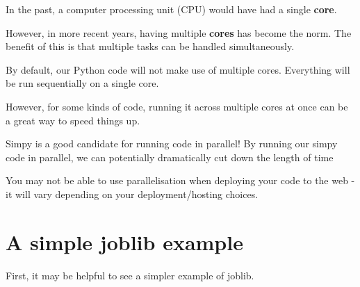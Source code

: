 \documentclass[
  letterpaper,
  DIV=11,
  numbers=noendperiod]{scrreprt}
\begin{document}
\begin{tcolorbox}[enhanced jigsaw, rightrule=.15mm, colback=white, colframe=quarto-callout-note-color-frame, colbacktitle=quarto-callout-note-color!10!white, toprule=.15mm, coltitle=black, opacityback=0, titlerule=0mm, bottomtitle=1mm, breakable, title=\textcolor{quarto-callout-note-color}{\faInfo}\hspace{0.5em}{Note}, opacitybacktitle=0.6, toptitle=1mm, arc=.35mm, bottomrule=.15mm, leftrule=.75mm, left=2mm]

In the past, a computer processing unit (CPU) would have had a single
\textbf{core}.

However, in more recent years, having multiple \textbf{cores} has become
the norm. The benefit of this is that multiple tasks can be handled
simultaneously.

By default, our Python code will not make use of multiple cores.
Everything will be run sequentially on a single core.

However, for some kinds of code, running it across multiple cores at
once can be a great way to speed things up.

\end{tcolorbox}

Simpy is a good candidate for running code in parallel! By running our
simpy code in parallel, we can potentially dramatically cut down the
length of time

\begin{tcolorbox}[enhanced jigsaw, rightrule=.15mm, colback=white, colframe=quarto-callout-warning-color-frame, colbacktitle=quarto-callout-warning-color!10!white, toprule=.15mm, coltitle=black, opacityback=0, titlerule=0mm, bottomtitle=1mm, breakable, title=\textcolor{quarto-callout-warning-color}{\faExclamationTriangle}\hspace{0.5em}{Warning}, opacitybacktitle=0.6, toptitle=1mm, arc=.35mm, bottomrule=.15mm, leftrule=.75mm, left=2mm]

You may not be able to use parallelisation when deploying your code to
the web - it will vary depending on your deployment/hosting choices.

\end{tcolorbox}

\section{A simple joblib example}\label{a-simple-joblib-example}

First, it may be helpful to see a simpler example of joblib.
\end{document}
